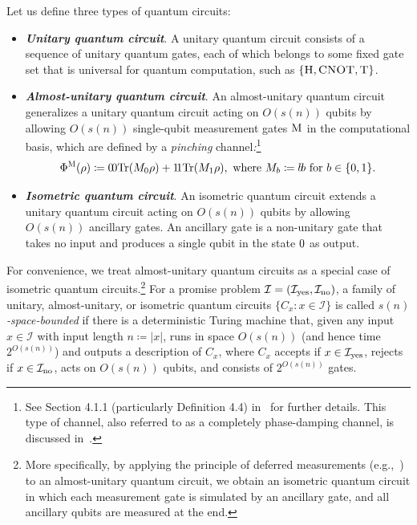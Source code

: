 \documentclass[11pt, a4paper]{article}
\numberwithin{equation}{section}
\numberwithin{figure}{section}
\DeclarePairedDelimiter\rbra{\lparen}{\rparen}
\let\ket\relax\DeclarePairedDelimiter\ket{\lvert}{\rangle}
\let\bra\relax\DeclarePairedDelimiter\bra{\langle}{\rvert}
\newcommand{\ketbra}[2]{\ensuremath{\ket{#1}\!\bra{#2}}}
\newcommand{\Tr}{\mathrm{Tr}}
\newcommand{\yes}{{\rm yes}}
\newcommand{\no}{{\rm no}}
\newcommand{\Had}{\textnormal{\textsc{H}}\xspace}
\newcommand{\CNOT}{\textnormal{\textsc{CNOT}}\xspace}
\newcommand{\M}{\textnormal{\textsc{M}}\xspace}
\newcommand{\T}{\textnormal{\textsc{T}}\xspace}
\newcommand{\binset}{\{0,1\}}
\newcommand{\calI}{\mathcal{I}}
\begin{document}
\begin{definition}
    \label{def:space-bounded-quantum-circuits}
    Let us define three types of quantum circuits: 
    \begin{itemize}[itemsep=0.33em, topsep=0.33em, parsep=0.33em, leftmargin=2em]
        \item \emph{\textbf{Unitary quantum circuit}}. A unitary quantum circuit consists of a sequence of unitary quantum gates, each of which belongs to some fixed gate set that is universal for quantum computation, such as $\{\Had, \CNOT, \T\}$. 
        \item \emph{\textbf{Almost-unitary quantum circuit}}. An almost-unitary quantum circuit generalizes a unitary quantum circuit acting on $O(s(n))$ qubits by allowing $O(s(n))$ single-qubit measurement gates $\M$ in the computational basis, which are defined by a \emph{pinching} channel\emph{:}\footnote{See Section 4.1.1 (particularly Definition 4.4) in~\cite{Watrous18} for further details. This type of channel, also referred to as a completely phase-damping channel, is discussed in~\cite[Equation (2.24)]{VW16}.} %
        \[\Phi^{\M}(\rho) \coloneqq \ketbra{0}{0} \Tr\rbra*{M_0 \rho} + \ketbra{1}{1} \Tr\rbra*{M_1 \rho}, \text{ where } M_b \coloneqq \ketbra{b}{b} \text{ for } b\in\binset.\] 
 
        \item \emph{\textbf{Isometric quantum circuit}}. An isometric quantum circuit extends a unitary quantum circuit acting on $O(s(n))$ qubits by allowing $O(s(n))$ ancillary gates. An ancillary gate is a non-unitary gate that takes no input and produces a single qubit in the state $\ket{0}$ as output. 
    \end{itemize}
    For convenience, we treat almost-unitary quantum circuits as a special case of isometric quantum circuits.\footnote{More specifically, by applying the principle of deferred measurements (e.g.,~\cite[Section 4.4]{NC10}) to an almost-unitary quantum circuit, we obtain an isometric quantum circuit in which each measurement gate is simulated by an ancillary gate, and all ancillary qubits are measured at the end.\label{footref:almost-unitary-is-isometry}}
    For a promise problem $\calI = (\calI_{\yes},\calI_{\no})$, a family of unitary, almost-unitary, or isometric quantum circuits $\{C_x: x\in \calI\}$ is called \emph{$s(n)$-space-bounded} if there is a deterministic Turing machine that, given any input $x \in \calI$ with input length $n \coloneqq |x|$, runs in space $O(s(n))$ (and hence time $2^{O(s(n))}$) and outputs a description of $C_x$, where $C_x$ accepts if $x \in \calI_{\yes}$, rejects if $x \in \calI_{\no}$, acts on $O(s(n))$ qubits, and consists of $2^{O(s(n))}$ gates.
\end{definition}
\end{document}
